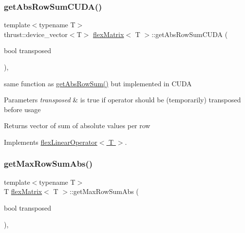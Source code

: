 \subsubsection{\texorpdfstring{get\+Abs\+Row\+Sum\+C\+U\+D\+A()}{getAbsRowSumCUDA()}}
{\footnotesize\ttfamily template$<$typename T$>$ \\
thrust\+::device\+\_\+vector$<$T$>$ \hyperlink{classflex_matrix}{flex\+Matrix}$<$ T $>$\+::get\+Abs\+Row\+Sum\+C\+U\+DA (\begin{DoxyParamCaption}\item[{bool}]{transposed }\end{DoxyParamCaption})\hspace{0.3cm}{\ttfamily [inline]}, {\ttfamily [virtual]}}



same function as \hyperlink{classflex_matrix_a75f378787fc81ea2c570c9848a7f2588}{get\+Abs\+Row\+Sum()} but implemented in C\+U\+DA 


\begin{DoxyParams}{Parameters}
{\em transposed} & is true if operator should be (temporarily) transposed before usage \\
\hline
\end{DoxyParams}
\begin{DoxyReturn}{Returns}
vector of sum of absolute values per row 
\end{DoxyReturn}


Implements \hyperlink{classflex_linear_operator_a0a0a431d43f4f9d36cbee0d31ba5a29b}{flex\+Linear\+Operator$<$ T $>$}.

\mbox{\label{classflex_matrix_a25cd9571e7056c4ad035a44a57e1d45d}} 
\subsubsection{\texorpdfstring{get\+Max\+Row\+Sum\+Abs()}{getMaxRowSumAbs()}}
{\footnotesize\ttfamily template$<$typename T$>$ \\
T \hyperlink{classflex_matrix}{flex\+Matrix}$<$ T $>$\+::get\+Max\+Row\+Sum\+Abs (\begin{DoxyParamCaption}\item[{bool}]{transposed }\end{DoxyParamCaption})\hspace{0.3cm}{\ttfamily [inline]}, {\ttfamily [virtual]}}



